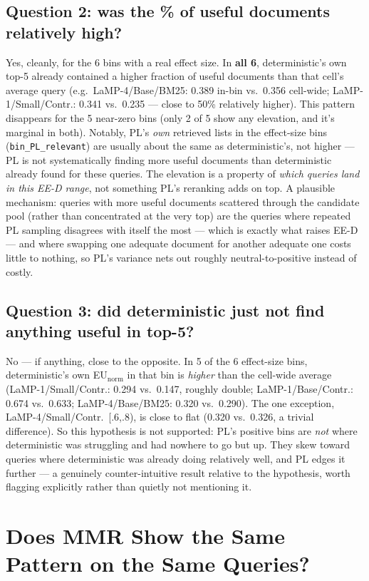 \documentclass[10pt]{article}
\begin{document}
\subsection*{Question 2: was the \% of useful documents relatively high?}
Yes, cleanly, for the 6 bins with a real effect size. In \textbf{all 6}, deterministic's
own top-5 already contained a higher fraction of useful documents than that cell's
average query (e.g.\ LaMP-4/Base/BM25: 0.389 in-bin vs.\ 0.356 cell-wide; LaMP-1/Small/Contr.:
0.341 vs.\ 0.235 --- close to 50\% relatively higher). This pattern disappears for the
5 near-zero bins (only 2 of 5 show any elevation, and it's marginal in both).
Notably, PL's \emph{own} retrieved lists in the effect-size bins (\texttt{bin\_PL\_relevant})
are usually about the same as deterministic's, not higher --- PL is not
systematically finding more useful documents than deterministic already found for
these queries. The elevation is a property of \emph{which queries land in this EE-D
range}, not something PL's reranking adds on top. A plausible mechanism: queries
with more useful documents scattered through the candidate pool (rather than
concentrated at the very top) are the queries where repeated PL sampling disagrees
with itself the most --- which is exactly what raises EE-D --- and where swapping
one adequate document for another adequate one costs little to nothing, so PL's
variance nets out roughly neutral-to-positive instead of costly.

\subsection*{Question 3: did deterministic just not find anything useful in top-5?}
No --- if anything, close to the opposite. In 5 of the 6 effect-size bins,
deterministic's own EU$_{\text{norm}}$ in that bin is \emph{higher} than the
cell-wide average (LaMP-1/Small/Contr.: 0.294 vs.\ 0.147, roughly double;
LaMP-1/Base/Contr.: 0.674 vs.\ 0.633; LaMP-4/Base/BM25: 0.320 vs.\ 0.290). The one
exception, LaMP-4/Small/Contr.\ [.6,.8), is close to flat (0.320 vs.\ 0.326, a
trivial difference). So this hypothesis is not supported: PL's positive bins are
\emph{not} where deterministic was struggling and had nowhere to go but up. They
skew toward queries where deterministic was already doing relatively well, and PL
edges it further --- a genuinely counter-intuitive result relative to the
hypothesis, worth flagging explicitly rather than quietly not mentioning it.

\FloatBarrier
\section{Does MMR Show the Same Pattern on the Same Queries?}
\label{sec:mmr-compare}
\end{document}
